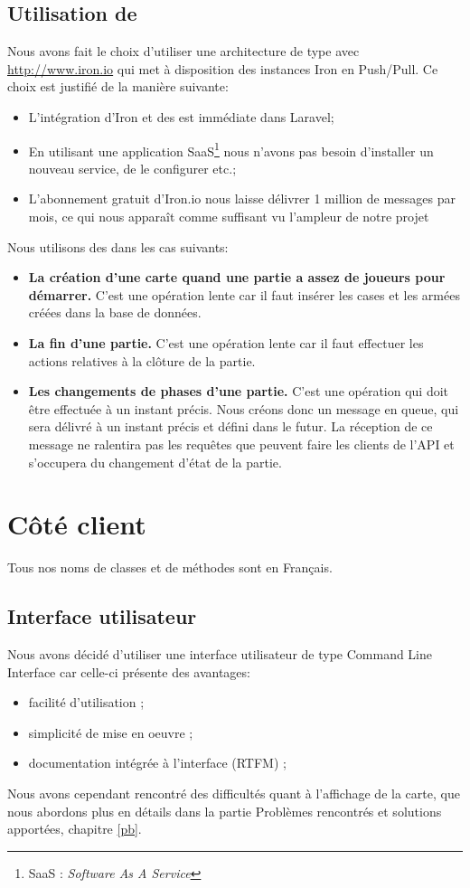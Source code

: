 	\subsection{Utilisation de \ppq{}}
		Nous avons fait le choix d'utiliser une architecture de type \ppq{} avec \url{http://www.iron.io} qui met à disposition des instances Iron en Push/Pull. Ce choix est justifié de la manière suivante:
		\begin{itemize}
			\item L'intégration d'Iron et des \ppq{} est immédiate dans Laravel;
			\item En utilisant une application SaaS\footnote{SaaS : \textit{Software As A Service}} nous n'avons pas besoin d'installer un nouveau service, de le configurer etc.;
			\item L'abonnement gratuit d'Iron.io nous laisse délivrer 1 million de messages par mois, ce qui nous apparaît comme suffisant vu l'ampleur de notre projet
		\end{itemize}\bigskip

		Nous utilisons des \ppq{} dans les cas suivants:
		\begin{itemize}
			\item \textbf{La création d'une carte quand une partie a assez de joueurs pour démarrer.} C'est une opération lente car il faut insérer les cases et les armées créées dans la base de données.
			\item \textbf{La fin d'une partie.} C'est une opération lente car il faut effectuer les actions relatives à la clôture de la partie.
			\item \textbf{Les changements de phases d'une partie.} C'est une opération qui doit être effectuée à un instant précis. Nous créons donc un message en queue, qui sera délivré à un instant précis et défini dans le futur. La réception de ce message ne ralentira pas les requêtes que peuvent faire les clients de l'API et s'occupera du changement d'état de la partie.
		\end{itemize}
\section{Côté client}
	Tous nos noms de classes et de méthodes sont en Français.
	\subsection{Interface utilisateur}
		Nous avons décidé d'utiliser une interface utilisateur de type Command Line Interface car celle-ci présente des avantages:
			\begin{itemize}
				\item facilité d'utilisation ;
				\item simplicité de mise en oeuvre ;
				\item documentation intégrée à l'interface (RTFM) ;
			\end{itemize}
		Nous avons cependant rencontré des difficultés quant à l'affichage de la carte, que nous abordons plus en détails dans la partie Problèmes rencontrés et solutions apportées, chapitre \ref{pb}.

